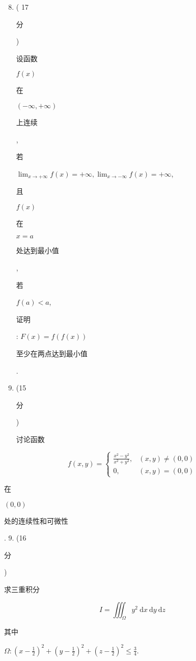 \documentclass[10pt]{article}
\begin{document}
\begin{enumerate}
  \setcounter{enumi}{7}
  \item ( 17 \begin{CJK}{UTF8}{mj}分\end{CJK}) \begin{CJK}{UTF8}{mj}设函数\end{CJK} $f(x)$ \begin{CJK}{UTF8}{mj}在\end{CJK} $(-\infty,+\infty)$ \begin{CJK}{UTF8}{mj}上连续\end{CJK}, \begin{CJK}{UTF8}{mj}若\end{CJK} $\lim _{x \rightarrow+\infty} f(x)=+\infty, \lim _{x \rightarrow-\infty} f(x)=+\infty$, \begin{CJK}{UTF8}{mj}且\end{CJK} $f(x)$ \begin{CJK}{UTF8}{mj}在\end{CJK} $x=a$ \begin{CJK}{UTF8}{mj}处达到最小值\end{CJK}, \begin{CJK}{UTF8}{mj}若\end{CJK} $f(a)<a$, \begin{CJK}{UTF8}{mj}证明\end{CJK}: $F(x)=f(f(x))$ \begin{CJK}{UTF8}{mj}至少在两点达到最小值\end{CJK}.

  \item (15 \begin{CJK}{UTF8}{mj}分\end{CJK}) \begin{CJK}{UTF8}{mj}讨论函数\end{CJK}

\end{enumerate}
$$
f(x, y)= \begin{cases}\frac{x^{2}-y^{2}}{x^{2}+y^{2}}, & (x, y) \neq(0,0) \\ 0, & (x, y)=(0,0)\end{cases}
$$
\begin{CJK}{UTF8}{mj}在\end{CJK} $(0,0)$ \begin{CJK}{UTF8}{mj}处的连续性和可微性\end{CJK}. 9. (16 \begin{CJK}{UTF8}{mj}分\end{CJK}) \begin{CJK}{UTF8}{mj}求三重积分\end{CJK}
$$
I=\iiint_{\Omega} y^{2} \mathrm{~d} x \mathrm{~d} y \mathrm{~d} z
$$
\begin{CJK}{UTF8}{mj}其中\end{CJK} $\Omega:\left(x-\frac{1}{2}\right)^{2}+\left(y-\frac{1}{2}\right)^{2}+\left(z-\frac{1}{2}\right)^{2} \leqslant \frac{3}{4}$.
\end{document}
